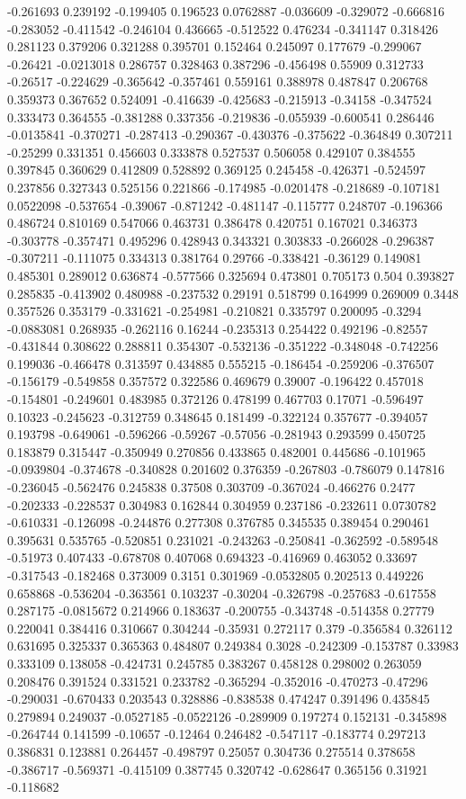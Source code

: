 -0.261693 0.239192 -0.199405 0.196523 0.0762887 -0.036609 -0.329072 -0.666816 -0.283052 -0.411542 -0.246104 0.436665 -0.512522 0.476234 -0.341147 0.318426 0.281123 0.379206 0.321288 0.395701 0.152464 0.245097 0.177679 -0.299067 -0.26421 -0.0213018 0.286757 0.328463 0.387296 -0.456498 0.55909 0.312733 -0.26517 -0.224629 -0.365642 -0.357461 0.559161 0.388978 0.487847 0.206768 0.359373 0.367652 0.524091 -0.416639 -0.425683 -0.215913 -0.34158 -0.347524 0.333473 0.364555 -0.381288 0.337356 -0.219836 -0.055939 -0.600541 0.286446 -0.0135841 -0.370271 -0.287413 -0.290367 -0.430376 -0.375622 -0.364849 0.307211 -0.25299 0.331351 0.456603 0.333878 0.527537 0.506058 0.429107 0.384555 0.397845 0.360629 0.412809 0.528892 0.369125 0.245458 -0.426371 -0.524597 0.237856 0.327343 0.525156 0.221866 -0.174985 -0.0201478 -0.218689 -0.107181 0.0522098 -0.537654 -0.39067 -0.871242 -0.481147 -0.115777 0.248707 -0.196366 0.486724 0.810169 0.547066 0.463731 0.386478 0.420751 0.167021 0.346373 -0.303778 -0.357471 0.495296 0.428943 0.343321 0.303833 -0.266028 -0.296387 -0.307211 -0.111075 0.334313 0.381764 0.29766 -0.338421 -0.36129 0.149081 0.485301 0.289012 0.636874 -0.577566 0.325694 0.473801 0.705173 0.504 0.393827 0.285835 -0.413902 0.480988 -0.237532 0.29191 0.518799 0.164999 0.269009 0.3448 0.357526 0.353179 -0.331621 -0.254981 -0.210821 0.335797 0.200095 -0.3294 -0.0883081 0.268935 -0.262116 0.16244 -0.235313 0.254422 0.492196 -0.82557 -0.431844 0.308622 0.288811 0.354307 -0.532136 -0.351222 -0.348048 -0.742256 0.199036 -0.466478 0.313597 0.434885 0.555215 -0.186454 -0.259206 -0.376507 -0.156179 -0.549858 0.357572 0.322586 0.469679 0.39007 -0.196422 0.457018 -0.154801 -0.249601 0.483985 0.372126 0.478199 0.467703 0.17071 -0.596497 0.10323 -0.245623 -0.312759 0.348645 0.181499 -0.322124 0.357677 -0.394057 0.193798 -0.649061 -0.596266 -0.59267 -0.57056 -0.281943 0.293599 0.450725 0.183879 0.315447 -0.350949 0.270856 0.433865 0.482001 0.445686 -0.101965 -0.0939804 -0.374678 -0.340828 0.201602 0.376359 -0.267803 -0.786079 0.147816 -0.236045 -0.562476 0.245838 0.37508 0.303709 -0.367024 -0.466276 0.2477 -0.202333 -0.228537 0.304983 0.162844 0.304959 0.237186 -0.232611 0.0730782 -0.610331 -0.126098 -0.244876 0.277308 0.376785 0.345535 0.389454 0.290461 0.395631 0.535765 -0.520851 0.231021 -0.243263 -0.250841 -0.362592 -0.589548 -0.51973 0.407433 -0.678708 0.407068 0.694323 -0.416969 0.463052 0.33697 -0.317543 -0.182468 0.373009 0.3151 0.301969 -0.0532805 0.202513 0.449226 0.658868 -0.536204 -0.363561 0.103237 -0.30204 -0.326798 -0.257683 -0.617558 0.287175 -0.0815672 0.214966 0.183637 -0.200755 -0.343748 -0.514358 0.27779 0.220041 0.384416 0.310667 0.304244 -0.35931 0.272117 0.379 -0.356584 0.326112 0.631695 0.325337 0.365363 0.484807 0.249384 0.3028 -0.242309 -0.153787 0.33983 0.333109 0.138058 -0.424731 0.245785 0.383267 0.458128 0.298002 0.263059 0.208476 0.391524 0.331521 0.233782 -0.365294 -0.352016 -0.470273 -0.47296 -0.290031 -0.670433 0.203543 0.328886 -0.838538 0.474247 0.391496 0.435845 0.279894 0.249037 -0.0527185 -0.0522126 -0.289909 0.197274 0.152131 -0.345898 -0.264744 0.141599 -0.10657 -0.12464 0.246482 -0.547117 -0.183774 0.297213 0.386831 0.123881 0.264457 -0.498797 0.25057 0.304736 0.275514 0.378658 -0.386717 -0.569371 -0.415109 0.387745 0.320742 -0.628647 0.365156 0.31921 -0.118682 